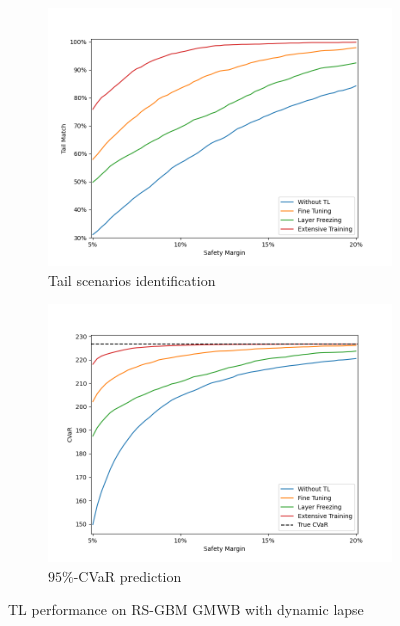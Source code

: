 \begin{figure}[ht!]
    \centering
    \begin{subfigure}{0.48\textwidth}
        \includegraphics[width=\textwidth]{./project3/figures/figure4_1.png}
        \caption{Tail scenarios identification} 
        \label{subfig3-4-1:tail}
    \end{subfigure}\hfill
    \begin{subfigure}{0.48\textwidth}
        \includegraphics[width=\textwidth]{./project3/figures/figure4_2.png}
        \caption{$95\%$-CVaR prediction}
        \label{subfig3-4-2:CVaR}
    \end{subfigure}
    \caption{TL performance on RS-GBM GMWB with dynamic lapse}
    \label{fig3:figure4-1}
\end{figure}

